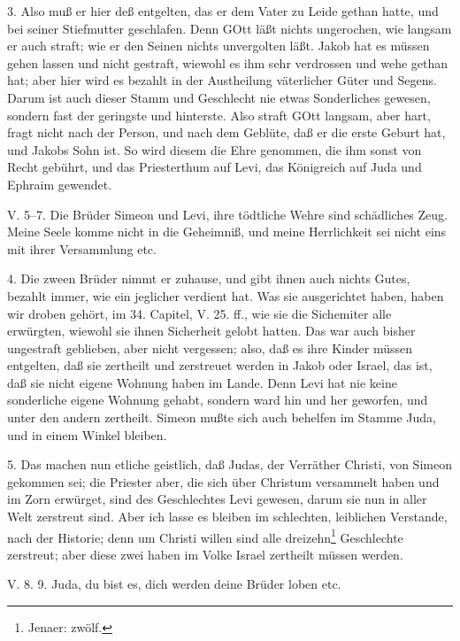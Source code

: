 3. Also muß er hier deß entgelten, das er dem Vater zu Leide gethan hatte, und bei seiner Stiefmutter geschlafen. Denn GOtt läßt nichts ungerochen, wie langsam er auch straft; wie er den Seinen nichts unvergolten läßt. Jakob hat es müssen gehen lassen und nicht gestraft, wiewohl es ihm sehr verdrossen und wehe gethan hat; aber hier wird es bezahlt in der Austheilung väterlicher Güter und Segens. Darum ist auch dieser Stamm und Geschlecht nie etwas Sonderliches gewesen, sondern fast der geringste und hinterste. Also straft GOtt langsam, aber hart, fragt nicht nach der Person, und nach dem Geblüte, daß er die erste Geburt hat, und Jakobs Sohn ist. So wird diesem die Ehre genommen, die ihm sonst von Recht gebührt, und das Priesterthum auf Levi, das Königreich auf Juda und Ephraim gewendet.

\begin{schriftzitat}
V. 5–7. Die Brüder Simeon und Levi, ihre tödtliche Wehre sind schädliches Zeug. Meine Seele komme nicht in die Geheimniß, und meine Herrlichkeit sei nicht eins mit ihrer Versammlung etc.
\end{schriftzitat}

4. Die zween Brüder nimmt er zuhause, und gibt ihnen auch nichts Gutes, bezahlt immer, wie ein jeglicher verdient hat. Was sie ausgerichtet haben, haben wir droben gehört, im 34. Capitel, V. 25. ff., wie sie die Sichemiter alle erwürgten, wiewohl sie ihnen Sicherheit gelobt hatten. Das war auch bisher ungestraft geblieben, aber nicht vergessen; also, daß es ihre Kinder müssen entgelten, daß sie zertheilt und zerstreuet werden in Jakob oder Israel, das ist, daß sie nicht eigene Wohnung haben im Lande. Denn Levi hat nie keine sonderliche eigene Wohnung gehabt, sondern ward hin und her geworfen, und unter den andern zertheilt. Simeon mußte sich auch behelfen im Stamme Juda, und in einem Winkel bleiben.

5. Das machen nun etliche geistlich, daß Judas, der Verräther Christi, von Simeon gekommen sei; die Priester aber, die sich über Christum versammelt haben und im Zorn erwürget, sind des Geschlechtes Levi gewesen, darum sie nun in aller Welt zerstreut sind. Aber ich lasse es bleiben im schlechten, leiblichen Verstande, nach der Historie; denn um Christi willen sind alle dreizehn\footnote{Jenaer: zwölf.} Geschlechte zerstreut; aber diese zwei haben im Volke Israel zertheilt müssen werden.

\begin{schriftzitat}
V. 8. 9. Juda, du bist es, dich werden deine Brüder loben etc.
\end{schriftzitat}

